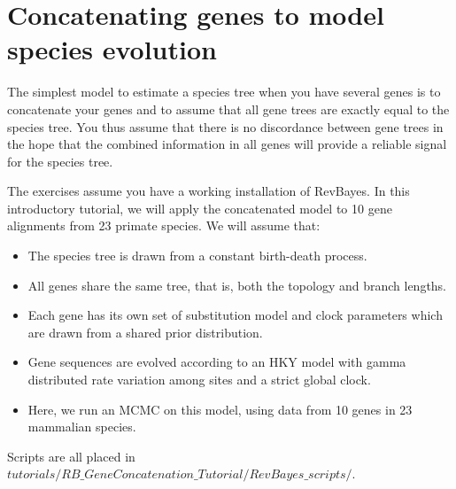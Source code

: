 \section{Concatenating genes to model species evolution}
The simplest model to estimate a species tree when you have several genes is to concatenate your genes and to assume that all gene trees are exactly equal to the species tree.
You thus assume that there is no discordance between gene trees in the hope that the combined information in all genes will provide a reliable signal for the species tree.

\vspace{20mm}

{\begin{framed}
\begin{center}
The exercises assume you have a working installation of RevBayes.
In this introductory tutorial, we will apply the concatenated model to 10 gene alignments from 23 primate species.
We will assume that:
\begin{itemize}
\item The species tree is drawn from a constant birth-death process.
\item All genes share the same tree, that is, both the topology and branch lengths.
\item Each gene has its own set of substitution model and clock parameters which are drawn from a shared prior distribution.
\item Gene sequences are evolved according to an HKY model with gamma distributed rate variation among sites and a strict global clock. 
\item Here, we run an MCMC on this model, using data from 10 genes in 23 mammalian species.
\end{itemize}
Scripts are all placed in {\footnotesize \emph{$tutorials/RB\_GeneConcatenation\_Tutorial/RevBayes\_scripts/$}}. 
\end{center}
\end{framed}}
\vspace{5mm}


